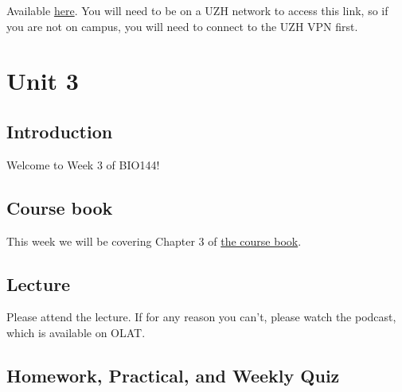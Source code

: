 \documentclass[
  letterpaper,
  8pt,
  a4paper]{book}
\begin{document}

Available
\href{https://rstudio.mnf.uzh.ch:3939/content/415e9279-c26a-4756-8570-fb1f9daab65c}{here}.
You will need to be on a UZH network to access this link, so if you are
not on campus, you will need to connect to the UZH VPN first.


\chapter*{Unit 3}\label{unit-3}


\section*{Introduction}\label{introduction-3}


Welcome to Week 3 of BIO144!

\section*{Course book}\label{course-book-2}


This week we will be covering Chapter 3 of
\href{https://opetchey.github.io/BIO144_Course_Book/}{the course book}.

\section*{Lecture}\label{lecture-2}


Please attend the lecture. If for any reason you can't, please watch the
podcast, which is available on OLAT.

\section*{Homework, Practical, and Weekly
Quiz}\label{homework-practical-and-weekly-quiz-2}

\end{document}
